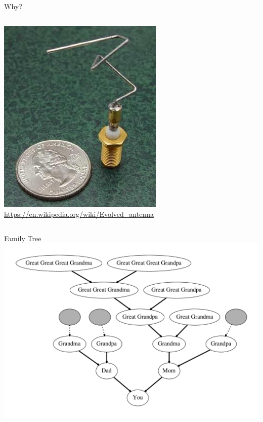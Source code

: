 \documentclass{beamer}
\begin{document}
\begin{frame}{Why?}
\begin{columns}
\begin{column}{0.3\textwidth}
\center \includegraphics[width=\textwidth]{Illustrations/antenna.jpg}\\{\tiny \url{https://en.wikipedia.org/wiki/Evolved_antenna}}
\end{column}
\end{columns}
\end{frame}

\begin{frame}{Family Tree}
\includegraphics[width=\textwidth]{Illustrations/family_blank.pdf}
\end{frame}
\end{document}
